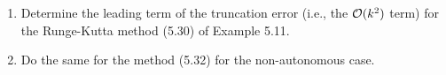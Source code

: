 

\begin{enumerate}
\item Determine the leading term of the truncation error (i.e., the
${\mathcal O}(k^2)$ term) for the Runge-Kutta method (5.30) of Example 5.11.

\item Do the same for the method (5.32) for the non-autonomous case.
\end{enumerate}


